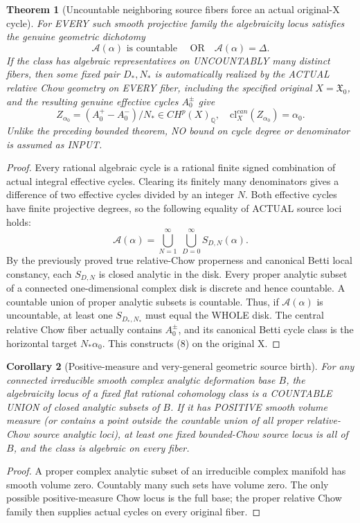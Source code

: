 \documentclass[11pt]{article}
\newcommand{\Q}{\mathbb Q}
\newcommand{\cl}{\mathrm{cl}}
\newtheorem{theorem}{Theorem}
\newtheorem{corollary}[theorem]{Corollary}
\begin{document}
\begin{theorem}[Uncountable neighboring source fibers force an actual original-X cycle]
For EVERY such smooth projective family the algebraicity
locus satisfies the genuine geometric dichotomy
\[
 \boxed{\mathscr A(\alpha)\text{ is countable }
                  \quad\text{OR}\quad \mathscr A(\alpha)=\Delta.}
                                                               \tag{7}
\]
If the class has algebraic representatives on UNCOUNTABLY
many distinct fibers, then some fixed pair \(D_*,N_*\)
is automatically realized by the ACTUAL relative Chow
geometry on EVERY fiber, including the specified original
\(X=\mathfrak X_0\), and the resulting genuine effective
cycles \(A_0^\pm\) give
\[
 \boxed{Z_{\alpha_0}=(A_0^+-A_0^-)/N_*\in CH^p(X)_\Q,
                 \quad\cl_X^{can}(Z_{\alpha_0})=\alpha_0.}
                                                               \tag{8}
\]
Unlike the preceding bounded theorem, NO bound on
cycle degree or denominator is assumed as INPUT.
\end{theorem}
\begin{proof}
Every rational algebraic cycle is a rational finite
signed combination of actual integral effective
cycles. Clearing its finitely many denominators
gives a difference of two effective cycles divided
by an integer \(N\). Both effective cycles have finite
projective degrees, so the following equality of
ACTUAL source loci holds:
\[
 \mathscr A(\alpha)=
 \bigcup_{N=1}^{\infty}\ \bigcup_{D=0}^{\infty}
                  S_{D,N}(\alpha).
\]
By the previously proved true relative-Chow
properness and canonical Betti local constancy,
each \(S_{D,N}\) is closed analytic in the disk.
Every proper analytic subset of a connected
one-dimensional complex disk is discrete and
hence countable. A countable union of proper
analytic subsets is countable. Thus, if
\(\mathscr A(\alpha)\) is uncountable, at least one
\(S_{D_*,N_*}\) must equal the WHOLE disk.
The central relative Chow fiber actually contains
\(A_0^\pm\), and its canonical Betti cycle class
is the horizontal target \(N_*\alpha_0\).
This constructs (8) on the original X.
\end{proof}

\begin{corollary}[Positive-measure and very-general geometric source birth]
For any connected irreducible smooth complex analytic
deformation base \(B\), the algebraicity locus of a
fixed flat rational cohomology class is a COUNTABLE
UNION of closed analytic subsets of \(B\). If it
has POSITIVE smooth volume measure (or contains
a point outside the countable union of all proper
relative-Chow source analytic loci), at least one
fixed bounded-Chow source locus is all of \(B\),
and the class is algebraic on every fiber.
\end{corollary}
\begin{proof}
A proper complex analytic subset of an irreducible
complex manifold has smooth volume zero. Countably
many such sets have volume zero. The only possible
positive-measure Chow locus is the full base;
the proper relative Chow family then supplies actual
cycles on every original fiber.
\end{proof}
\end{document}
